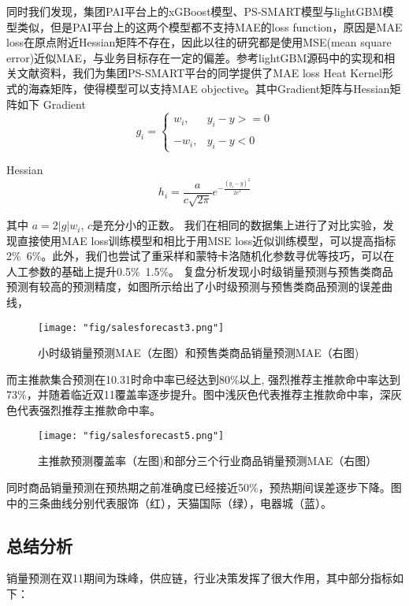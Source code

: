 同时我们发现，集团PAI平台上的xGBoost模型、PS-SMART模型与lightGBM模型类似，但是PAI平台上的这两个模型都不支持MAE的loss function，原因是MAE loss在原点附近Hessian矩阵不存在，因此以往的研究都是使用MSE(mean square error)近似MAE，与业务目标存在一定的偏差。参考lightGBM源码中的实现和相关文献资料，我们为集团PS-SMART平台的同学提供了MAE loss Heat Kernel形式的海森矩阵，使得模型可以支持MAE objective。其中Gradient矩阵与Hessian矩阵如下
Gradient
$$g_{i} = \begin{cases}
w_i, &  y_{i} - y >=0\\\\ 
-w_i, &  y_{i} - y <0
\end{cases}$$

Hessian
$$h_{i} = \frac{a}{c\sqrt{2\pi}}e^{-\frac{(y_i-y)^2}{2c^2}}
$$

其中 $a=2|g|w_i$, $c$是充分小的正数。
我们在相同的数据集上进行了对比实验，发现直接使用MAE loss训练模型和相比于用MSE loss近似训练模型，可以提高指标2\%~6\%。此外，我们也尝试了重采样和蒙特卡洛随机化参数寻优等技巧，可以在人工参数的基础上提升0.5\%~1.5\%。
复盘分析发现小时级销量预测与预售类商品预测有较高的预测精度，如图所示给出了小时级预测与预售类商品预测的误差曲线，

\begin{figure}[!h]
	\centering
	\texttt{[image: "fig/salesforecast3.png"]}
	\caption{小时级销量预测MAE（左图）和预售类商品销量预测MAE（右图)}
	\label{fig:sf3}
\end{figure}


而主推款集合预测在10.31时命中率已经达到80\%以上, 强烈推荐主推款命中率达到73\%，并随着临近双11覆盖率逐步提升。图中浅灰色代表推荐主推款命中率，深灰色代表强烈推荐主推款命中率。

\begin{figure}[!h]
	\centering
	\texttt{[image: "fig/salesforecast5.png"]}
	\caption{主推款预测覆盖率（左图)和部分三个行业商品销量预测MAE（右图）}
	\label{fig:sf5}
\end{figure}

同时商品销量预测在预热期之前准确度已经接近50\%，预热期间误差逐步下降。图中的三条曲线分别代表服饰（红），天猫国际（绿），电器城（蓝）。

\subsection{总结分析}

销量预测在双11期间为珠峰，供应链，行业决策发挥了很大作用，其中部分指标如下：

